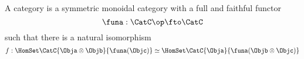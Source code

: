 \begin{definition}
    \label{def:star-autonomous-categor-2y}
    A \starautonomous category is a symmetric monoidal category
    with a full and faithful functor
    \begin{equation}
        \funa: \CatC\op \fto \CatC
    \end{equation}
    such that there is a natural isomorphism
    \begin{equation}
        f : \HomSet\CatC{\Obja \otimes \Objb}{\funa(\Objc)} \simeq \HomSet\CatC{\Obja}{\funa(\Objb \otimes \Objc)}
    \end{equation}
\end{definition}

